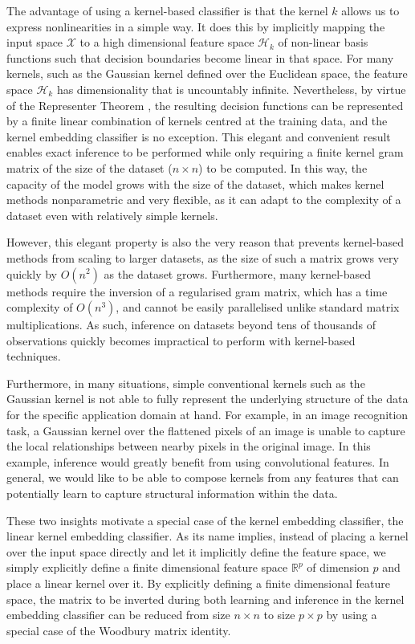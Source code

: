 \documentclass{article}
\begin{document}
		The advantage of using a kernel-based classifier is that the kernel $k$ allows us to express nonlinearities in a simple way. It does this by implicitly mapping the input space $\mathcal{X}$ to a high dimensional feature space $\mathcal{H}_{k}$ of non-linear basis functions such that decision boundaries become linear in that space. For many kernels, such as the Gaussian kernel defined over the Euclidean space, the feature space $\mathcal{H}_{k}$ has dimensionality that is uncountably infinite. Nevertheless, by virtue of the Representer Theorem \citep{kimeldorf1971some}, the resulting decision functions can be represented by a finite linear combination of kernels centred at the training data, and the kernel embedding classifier is no exception. This elegant and convenient result enables exact inference to be performed while only requiring a finite kernel gram matrix of the size of the dataset ($n \times n$) to be computed. In this way, the capacity of the model grows with the size of the dataset, which makes kernel methods nonparametric and very flexible, as it can adapt to the complexity of a dataset even with relatively simple kernels. 
		
		However, this elegant property is also the very reason that prevents kernel-based methods from scaling to larger datasets, as the size of such a matrix grows very quickly by $O(n^{2})$ as the dataset grows. Furthermore, many kernel-based methods require the inversion of a regularised gram matrix, which has a time complexity of $O(n^{3})$, and cannot be easily parallelised unlike standard matrix multiplications. As such, inference on datasets beyond tens of thousands of observations quickly becomes impractical to perform with kernel-based techniques.
		
		Furthermore, in many situations, simple conventional kernels such as the Gaussian kernel is not able to fully represent the underlying structure of the data for the specific application domain at hand. For example, in an image recognition task, a Gaussian kernel over the flattened pixels of an image is unable to capture the local relationships between nearby pixels in the original image. In this example, inference would greatly benefit from using convolutional features. In general, we would like to be able to compose kernels from any features that can potentially learn to capture structural information within the data.
		
		These two insights motivate a special case of the kernel embedding classifier, the linear kernel embedding classifier. As its name implies, instead of placing a kernel over the input space directly and let it implicitly define the feature space, we simply explicitly define a finite dimensional feature space $\mathbb{R}^{p}$ of dimension $p$ and place a linear kernel over it. By explicitly defining a finite dimensional feature space, the matrix to be inverted during both learning and inference in the kernel embedding classifier can be reduced from size $n \times n$ to size $p \times p$ by using a special case of the Woodbury matrix identity.
		
\end{document}
